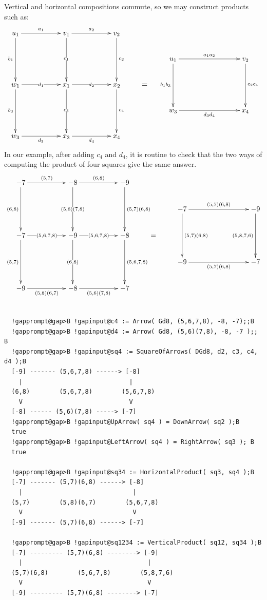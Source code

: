 \documentclass[a4paper,11pt]{report}
\begin{document}
{{ Vertical and horizontal compositions commute, so we may construct products
such as: 
\[  \vcenter{\xymatrix @=2pc{ u_1 \ar[rr]^{a_1} \ar[dd]_{b_1} && v_1 \ar[rr]^{a_2}
\ar[dd]|{c_1} && v_2 \ar[dd]^{c_2} & & &&& \\ && && & & u_1 \ar[rrr]^{a_1a_2}
\ar[dd]_{b_1b_3} &&& v_2 \ar[dd]^{c_2c_4} \\ w_1 \ar[rr]|{d_1} \ar[dd]_{b_3}
&& x_1 \ar[rr]|{d_2} \ar[dd]|{c_3} && x_2 \ar[dd]^{c_4} &=& &&& \\ && && & &
w_3 \ar[rrr]_{d_3d_4} &&& x_4 \\ w_3 \ar[rr]_{d_3} && x_3 \ar[rr]_{d_4} && x_4
}} \]
 In our example, after adding $c_4$ and $d_4$, it is routine to check that the two ways of computing the product of four
squares give the same answer. 
\[  \vcenter{\xymatrix @=2pc{ -7 \ar[rr]^{(5,7)} \ar[dd]_{(6,8)} && -8
\ar[rr]^{(6,8)} \ar[dd]|{(5,6)(7,8)} && -9 \ar[dd]^{(5,7)(6,8)} & & &&& \\ &&
&& & & -7 \ar[rrr]^{(5,7)(6,8)} \ar[dd]^{(5,7)(6,8)} &&& -9
\ar[dd]_{(5,8,7,6)} \\ -7 \ar[rr]|{(5,6,7,8)} \ar[dd]_{(5,7)} && -9
\ar[rr]|{(5,6,7,8)} \ar[dd]|{(6,8)} && -8 \ar[dd]^{(5,6,7,8)} &=& &&& \\ && &&
& & -9 \ar[rrr]_{(5,7)(6,8)} &&& -7 \\ -9 \ar[rr]_{(5,8)(6,7)} && -8
\ar[rr]_{(5,6)(7,8)} && -7 }} \]
 
\begin{Verbatim}[commandchars=!@B,fontsize=\small,frame=single,label=Example]
  
  !gapprompt@gap>B !gapinput@c4 := Arrow( Gd8, (5,6,7,8), -8, -7);;B
  !gapprompt@gap>B !gapinput@d4 := Arrow( Gd8, (5,6)(7,8), -8, -7 );; B
  !gapprompt@gap>B !gapinput@sq4 := SquareOfArrows( DGd8, d2, c3, c4, d4 );B
  [-9] ------- (5,6,7,8) ------> [-8]
    |                             |
  (6,8)        (5,6,7,8)        (5,6,7,8)
    V                             V
  [-8] ------ (5,6)(7,8) -----> [-7]
  !gapprompt@gap>B !gapinput@UpArrow( sq4 ) = DownArrow( sq2 );B
  true
  !gapprompt@gap>B !gapinput@LeftArrow( sq4 ) = RightArrow( sq3 ); B
  true
  
  !gapprompt@gap>B !gapinput@sq34 := HorizontalProduct( sq3, sq4 );B
  [-7] ------- (5,7)(6,8) ------> [-8]
    |                              |
  (5,7)        (5,8)(6,7)        (5,6,7,8)
    V                              V
  [-9] ------- (5,7)(6,8) ------> [-7]
  
  !gapprompt@gap>B !gapinput@sq1234 := VerticalProduct( sq12, sq34 );B
  [-7] --------- (5,7)(6,8) --------> [-9]
    |                                  |
  (5,7)(6,8)        (5,6,7,8)        (5,8,7,6)
    V                                  V
  [-9] --------- (5,7)(6,8) --------> [-7]
  

\end{Verbatim}}}
\end{document}
